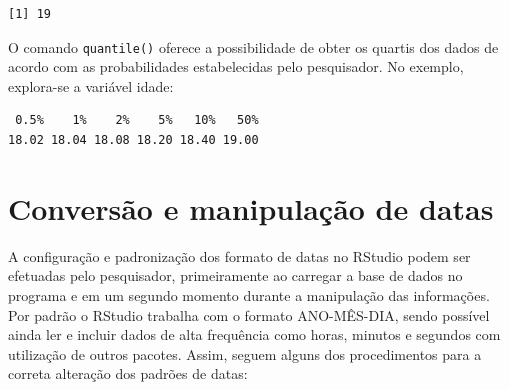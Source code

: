 \documentclass[12pt,brazil,oneside]{book}
\newenvironment{Shaded}{\begin{snugshade}}{\end{snugshade}}
\newcommand{\CommentTok}[1]{\textcolor[rgb]{0.56,0.35,0.01}{\textit{#1}}}
\newcommand{\DataTypeTok}[1]{\textcolor[rgb]{0.13,0.29,0.53}{#1}}
\newcommand{\DecValTok}[1]{\textcolor[rgb]{0.00,0.00,0.81}{#1}}
\newcommand{\FloatTok}[1]{\textcolor[rgb]{0.00,0.00,0.81}{#1}}
\newcommand{\KeywordTok}[1]{\textcolor[rgb]{0.13,0.29,0.53}{\textbf{#1}}}
\newcommand{\NormalTok}[1]{#1}
\newcommand{\OperatorTok}[1]{\textcolor[rgb]{0.81,0.36,0.00}{\textbf{#1}}}
\begin{document}
\begin{Shaded}
\end{Shaded}

\begin{verbatim}
[1] 19
\end{verbatim}

O comando \texttt{quantile()} oferece a possibilidade de obter os quartis dos dados de acordo com as probabilidades estabelecidas pelo pesquisador. No exemplo, explora-se a variável idade:

\begin{Shaded}
\end{Shaded}

\begin{verbatim}
 0.5%    1%    2%    5%   10%   50% 
18.02 18.04 18.08 18.20 18.40 19.00 
\end{verbatim}

\hypertarget{conversao-e-manipulacao-de-datas}{%
\section{Conversão e manipulação de datas}\label{conversao-e-manipulacao-de-datas}}

A configuração e padronização dos formato de datas no RStudio podem ser efetuadas pelo pesquisador, primeiramente ao carregar a base de dados no programa e em um segundo momento durante a manipulação das informações. Por padrão o RStudio trabalha com o formato ANO-MÊS-DIA, sendo possível ainda ler e incluir dados de alta frequência como horas, minutos e segundos com utilização de outros pacotes. Assim, seguem alguns dos procedimentos para a correta alteração dos padrões de datas:
\end{document}
